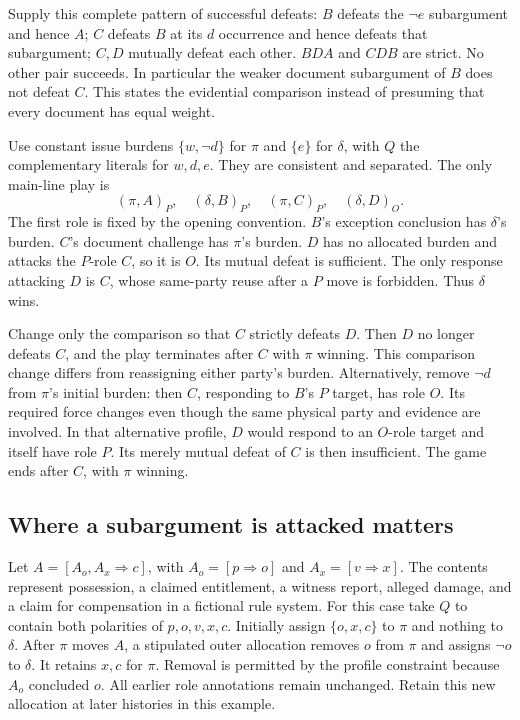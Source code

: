 Supply this complete pattern of successful defeats:
\(B\) defeats the \(\neg e\) subargument and hence \(A\);
\(C\) defeats \(B\) at its \(d\) occurrence and hence defeats
that subargument;
\(C,D\) mutually defeat each other.
\(BDA\) and \(CDB\) are strict.
No other pair succeeds. In particular the weaker document
subargument of \(B\) does not defeat \(C\).
This states the evidential comparison instead of presuming that
every document has equal weight.

Use constant issue burdens \(\{w,\neg d\}\) for \(\pi\) and
\(\{e\}\) for \(\delta\), with \(Q\) the complementary literals
for \(w,d,e\).
They are consistent and separated.
The only main-line play is
\[
(\pi,A)_P,\quad(\delta,B)_P,\quad
(\pi,C)_P,\quad(\delta,D)_O .
\]
The first role is fixed by the opening convention.
\(B\)'s exception conclusion has \(\delta\)'s burden.
\(C\)'s document challenge has \(\pi\)'s burden.
\(D\) has no allocated burden and attacks the \(P\)-role \(C\),
so it is \(O\).
Its mutual defeat is sufficient.
The only response attacking \(D\) is \(C\), whose same-party
reuse after a \(P\) move is forbidden. Thus \(\delta\) wins.

Change only the comparison so that \(C\) strictly defeats \(D\).
Then \(D\) no longer defeats \(C\), and the play terminates after
\(C\) with \(\pi\) winning. This comparison change differs from
reassigning either party's burden.
Alternatively, remove \(\neg d\) from \(\pi\)'s initial burden:
then \(C\), responding to \(B\)'s \(P\) target, has role \(O\).
Its required force changes even though the same physical party
and evidence are involved. In that alternative profile, \(D\)
would respond to an \(O\)-role target and itself have role \(P\).
Its merely mutual defeat of \(C\) is then insufficient.
The game ends after \(C\), with \(\pi\) winning.

\subsection{Where a subargument is attacked matters}
\label{sec:p18-lis-target-specific}

Let \(A=[A_o,A_x\Rightarrow c]\), with
\(A_o=[p\Rightarrow o]\) and \(A_x=[v\Rightarrow x]\).
The contents represent possession, a claimed entitlement,
a witness report, alleged damage, and a claim for compensation
in a fictional rule system.
For this case take \(Q\) to contain both polarities of
\(p,o,v,x,c\).
Initially assign \(\{o,x,c\}\) to \(\pi\) and nothing to \(\delta\).
After \(\pi\) moves \(A\), a stipulated outer allocation removes
\(o\) from \(\pi\) and assigns \(\neg o\) to \(\delta\).
It retains \(x,c\) for \(\pi\).
Removal is permitted by the profile constraint because \(A_o\)
concluded \(o\). All earlier role annotations remain unchanged.
Retain this new allocation at later histories in this example.

